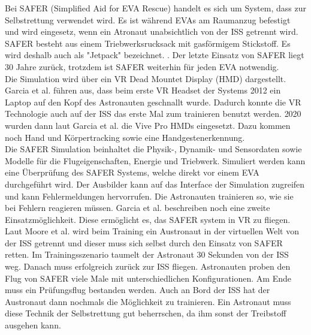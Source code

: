 Bei SAFER (Simplified Aid for EVA Rescue) handelt es sich um System, dass zur Selbstrettung verwendet wird. \cite{moore201021st}
Es ist während EVAs am Raumanzug befestigt und wird eingesetz, wenn ein Atronaut unabsichtlich von der ISS getrennt wird. \cite{miralles2013onboard}
SAFER besteht aus einem Triebwerksrucksack mit gasförmigem Stickstoff. \cite{moore201021st}
Es wird deshalb auch als "Jetpack" bezeichnet. \cite{garcia2020training}.
Der letzte Einsatz von SAFER liegt 30 Jahre zurück, trotzdem ist SAFER weiterhin für jeden EVA notwendig.\cite{garcia2020training}
\\
Die Simulation wird über ein VR Dead Mountet Display (HMD) dargestellt. \cite{garcia2020training}
Garcia et al. führen aus, dass beim erste VR Headset der Systems 2012 ein Laptop auf den Kopf des Astronauten geschnallt wurde.
Dadurch konnte die VR Technologie auch auf der ISS das erste Mal zum trainieren benutzt werden. \cite{garcia2020training}
2020 wurden dann laut Garcia et al. die Vive Pro HMDs eingesetzt. Dazu kommen noch Hand und Körpertracking sowie eine Handgestenerkennung. \cite{garcia2020training}
\\
Die SAFER Simulation beinhaltet die Physik-, Dynamik- und Sensordaten sowie Modelle für die Flugeigenschaften, Energie und Triebwerk. \cite{garcia2020training}
Simuliert werden kann eine Überprüfung des SAFER Systems, welche direkt vor einem EVA durchgeführt wird.
Der Ausbilder kann auf das Interface der Simulation zugreifen und kann Fehlermeldungen hervorrufen. Die Astronauten trainieren so, wie sie bei Fehlern reagieren müssen. \cite{garcia2020training}
Garcia et al. beschreiben noch eine zweite Einsatzmöglichkeit. Diese ermöglicht es, das SAFER system in VR zu fliegen. \cite{garcia2020training}
Laut Moore et al. wird beim Training ein Austronaut in der virtuellen Welt von der ISS getrennt und dieser muss sich selbst durch den Einsatz von SAFER retten. \cite{moore201021st}
Im Trainingsszenario taumelt der Astronaut 30 Sekunden von der ISS weg. Danach muss erfolgreich zurück zur ISS fliegen. Astronauten proben den Flug von SAFER viele Male mit unterschiedlichen Konfigurationen. Am Ende muss ein Prüfungsflug bestanden werden.
Auch an Bord der ISS hat der Austronaut dann nochmals die Möglichkeit zu trainieren. \cite{garcia2020training}
Ein Astronaut muss diese Technik der Selbstrettung gut beherrschen, da ihm sonst der Treibstoff ausgehen kann. \cite{moore201021st}
